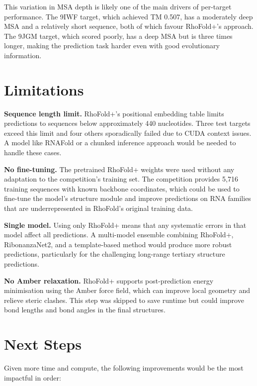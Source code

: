 \documentclass[11pt,a4paper]{article}
\begin{document}
This variation in MSA depth is likely one of the main drivers of per-target performance. The 9IWF target, which achieved TM 0.507, has a moderately deep MSA and a relatively short sequence, both of which favour RhoFold+'s approach. The 9JGM target, which scored poorly, has a deep MSA but is three times longer, making the prediction task harder even with good evolutionary information.

\section{Limitations}

\textbf{Sequence length limit.} RhoFold+'s positional embedding table limits predictions to sequences below approximately 440 nucleotides. Three test targets exceed this limit and four others sporadically failed due to CUDA context issues. A model like RNAFold or a chunked inference approach would be needed to handle these cases.

\textbf{No fine-tuning.} The pretrained RhoFold+ weights were used without any adaptation to the competition's training set. The competition provides 5,716 training sequences with known backbone coordinates, which could be used to fine-tune the model's structure module and improve predictions on RNA families that are underrepresented in RhoFold's original training data.

\textbf{Single model.} Using only RhoFold+ means that any systematic errors in that model affect all predictions. A multi-model ensemble combining RhoFold+, RibonanzaNet2, and a template-based method would produce more robust predictions, particularly for the challenging long-range tertiary structure predictions.

\textbf{No Amber relaxation.} RhoFold+ supports post-prediction energy minimisation using the Amber force field, which can improve local geometry and relieve steric clashes. This step was skipped to save runtime but could improve bond lengths and bond angles in the final structures.

\section{Next Steps}

Given more time and compute, the following improvements would be the most impactful in order:
\end{document}
